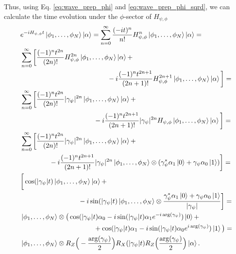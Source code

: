 \documentclass[a4paper,10pt]{report}
\begin{document}
Thus, using Eq. \eqref{eq:wave_prep_phi} and \eqref{eq:wave_prep_phi_sqrd}, we can calculate the time evolution under the $\phi$-sector of $H_{\psi,\phi}$
\begin{align}
&e^{-iH_{\psi,\phi}t}\ket{\phi_1,\dots,\phi_N}\ket{\alpha} = \sum_{n=0}^\infty \frac{(-it)^n}{n!}H_{\psi,\phi}^n \ket{\phi_1,\dots,\phi_N}\ket{\alpha} = \nonumber\\
&\sum_{n=0}^\infty\bigg[\frac{(-1)^nt^{2n}}{(2n)!}H_{\psi,\phi}^{2n} \ket{\phi_1,\dots,\phi_N}\ket{\alpha} + \nonumber\\
&\hspace{4.5cm}-i\frac{(-1)^nt^{2n+1}}{(2n+1)!} H_{\psi,\phi}^{2n+1} \ket{\phi_1,\dots,\phi_N}\ket{\alpha}\bigg] = \nonumber\\
&\sum_{n=0}^\infty\bigg[\frac{(-1)^nt^{2n}}{(2n)!}|\gamma_\psi|^{2n} \ket{\phi_1,\dots,\phi_N}\ket{\alpha} + \nonumber\\
&\hspace{3.8cm}-i\frac{(-1)^nt^{2n+1}}{(2n+1)!}|\gamma_\psi|^{2n} H_{\psi,\phi}\ket{\phi_1,\dots,\phi_N}\ket{\alpha}\bigg] = \nonumber\\
&\sum_{n=0}^\infty\bigg[\frac{(-1)^nt^{2n}}{(2n)!}|\gamma_\psi|^{2n} \ket{\phi_1,\dots,\phi_N}\ket{\alpha} + \nonumber\\
&\hspace{1.5cm}-i\frac{(-1)^nt^{2n+1}}{(2n+1)!}|\gamma_\psi|^{2n} \ket{\phi_1,\dots,\phi_N}\otimes(\gamma_\psi^*\alpha_1\ket{0} + \gamma_\psi\alpha_0\ket{1})\bigg] = \nonumber\\
&\bigg[\cos(|\gamma_\psi|t)\ket{\phi_1,\dots,\phi_N}\ket{\alpha} + \nonumber\\
&\hspace{3cm}-i\sin(|\gamma_\psi|t)\ket{\phi_1,\dots,\phi_N}\otimes\frac{\gamma_\psi^*\alpha_1\ket{0} + \gamma_\psi\alpha_0\ket{1}}{|\gamma_\psi|}\bigg] = \nonumber\\
&\ket{\phi_1,\dots,\phi_N}\otimes \big(\cos(|\gamma_\psi|t)\alpha_0 -i\sin(|\gamma_\psi|t)\alpha_1e^{-i\arg(\gamma_\psi)})\ket{0} + \nonumber\\
&\hspace{3.8cm}+ \cos(|\gamma_\psi|t)\alpha_1 -i\sin(|\gamma_\psi|t)\alpha_0e^{i\arg(\gamma_\psi)})\ket{1}\big) = \nonumber\\
&\ket{\phi_1,\dots,\phi_N}\otimes R_Z\Big(-\frac{\arg(\gamma_\psi)}{2}\Big)R_X(|\gamma_\psi|t)R_Z\Big(\frac{\arg(\gamma_\psi)}{2}\Big)\ket{\alpha}.
\label{eq:prop_phi}
\end{align}
\end{document}

